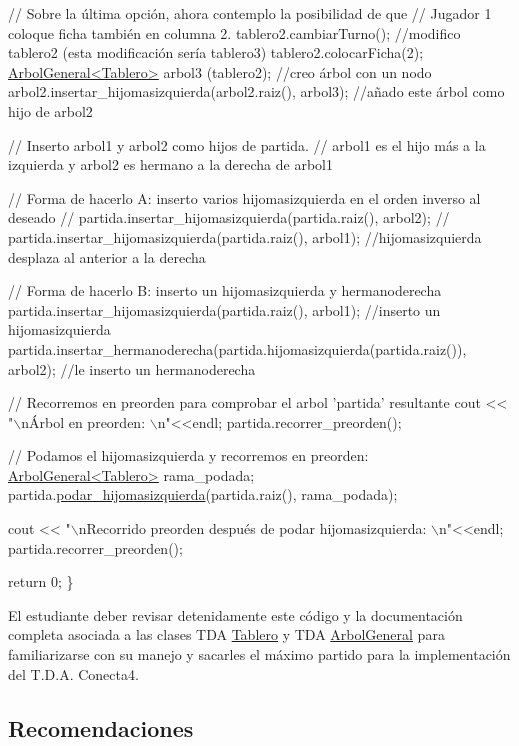 \begin{DoxyCode}
    \textcolor{comment}{// Sobre la última opción, ahora contemplo la posibilidad de que }
    \textcolor{comment}{//  Jugador 1 coloque ficha también en columna 2. }
    tablero2.cambiarTurno();          \textcolor{comment}{//modifico tablero2 (esta modificación sería tablero3)}
    tablero2.colocarFicha(2); 
    \hyperlink{classArbolGeneral}{ArbolGeneral<Tablero>} arbol3 (tablero2);  \textcolor{comment}{//creo árbol con un nodo}
    arbol2.insertar\_hijomasizquierda(arbol2.raiz(), arbol3);  \textcolor{comment}{//añado este árbol como hijo de arbol2}

    \textcolor{comment}{// Inserto arbol1 y arbol2 como hijos de partida. }
    \textcolor{comment}{// arbol1 es el hijo más a la izquierda y arbol2 es hermano a la derecha de arbol1}
  
    \textcolor{comment}{//  Forma de hacerlo A: inserto varios hijomasizquierda en el orden inverso al deseado}
    \textcolor{comment}{//  partida.insertar\_hijomasizquierda(partida.raiz(), arbol2);}
    \textcolor{comment}{//  partida.insertar\_hijomasizquierda(partida.raiz(), arbol1);  //hijomasizquierda desplaza al anterior
       a la derecha}
  
    \textcolor{comment}{// Forma de hacerlo B: inserto un hijomasizquierda y hermanoderecha}
    partida.insertar\_hijomasizquierda(partida.raiz(), arbol1);              \textcolor{comment}{//inserto un hijomasizquierda}
    partida.insertar\_hermanoderecha(partida.hijomasizquierda(partida.raiz()), arbol2);  \textcolor{comment}{//le inserto un
       hermanoderecha}
    

    \textcolor{comment}{// Recorremos en preorden para comprobar el arbol 'partida' resultante}
    cout << \textcolor{stringliteral}{"\(\backslash\)nÁrbol en preorden: \(\backslash\)n"}<<endl; 
    partida.recorrer\_preorden();

    \textcolor{comment}{// Podamos el hijomasizquierda y recorremos en preorden: }
    \hyperlink{classArbolGeneral}{ArbolGeneral<Tablero>} rama\_podada;
    partida.\hyperlink{classArbolGeneral_a7f2fa2d9be4af4b7be1c334819a04c39}{podar\_hijomasizquierda}(partida.raiz(), rama\_podada);

    cout << \textcolor{stringliteral}{"\(\backslash\)nRecorrido preorden después de podar hijomasizquierda: \(\backslash\)n"}<<endl; 
    partida.recorrer\_preorden();

    \textcolor{keywordflow}{return} 0;
\}
\end{DoxyCode}


El estudiante deber revisar detenidamente este código y la documentación completa asociada a las clases T\-D\-A \hyperlink{classTablero}{Tablero} y T\-D\-A \hyperlink{classArbolGeneral}{Arbol\-General} para familiarizarse con su manejo y sacarles el máximo partido para la implementación del T.\-D.\-A. Conecta4.\hypertarget{index_recomendaciones}{}\subsection{Recomendaciones}\label{index_recomendaciones}

